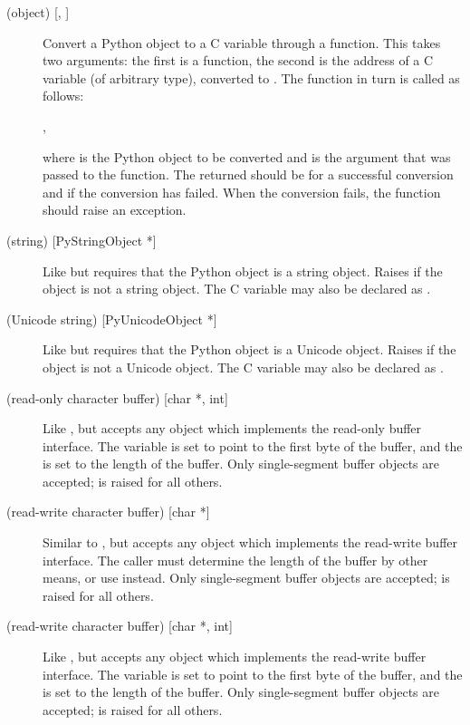 \begin{description}
  \item[ (object) {[, ]}]
  Convert a Python object to a C variable through a 
  function.  This takes two arguments: the first is a function, the
  second is the address of a C variable (of arbitrary type), converted
  to .  The  function in turn is called
  as follows:

  \code{ = }\code{(},
  \code{);}

  where  is the Python object to be converted and
   is the  argument that was passed to the
   function.  The returned 
  should be  for a successful conversion and  if the
  conversion has failed.  When the conversion fails, the
   function should raise an exception.

  \item[ (string) {[PyStringObject *]}]
  Like  but requires that the Python object is a string
  object.  Raises  if the object is not a string
  object.  The C variable may also be declared as .

  \item[ (Unicode string) {[PyUnicodeObject *]}]
  Like  but requires that the Python object is a Unicode
  object.  Raises  if the object is not a Unicode
  object.  The C variable may also be declared as .

  \item[ (read-only character buffer) {[char *, int]}]
  Like , but accepts any object which implements the
  read-only buffer interface.  The  variable is set to
  point to the first byte of the buffer, and the  is set to
  the length of the buffer.  Only single-segment buffer objects are
  accepted;  is raised for all others.

  \item[ (read-write character buffer) {[char *]}]
  Similar to , but accepts any object which implements the
  read-write buffer interface.  The caller must determine the length
  of the buffer by other means, or use  instead.  Only
  single-segment buffer objects are accepted;  is
  raised for all others.

  \item[ (read-write character buffer) {[char *, int]}]
  Like , but accepts any object which implements the
  read-write buffer interface.  The  variable is set to
  point to the first byte of the buffer, and the  is set to
  the length of the buffer.  Only single-segment buffer objects are
  accepted;  is raised for all others.


\end{description}
